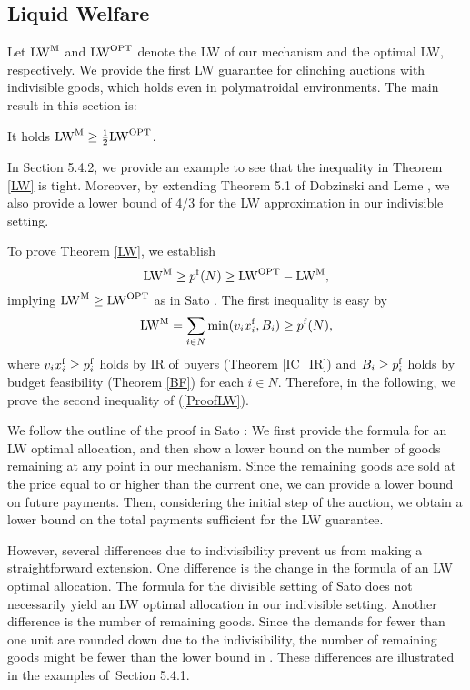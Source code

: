 \documentclass[letterpaper,11pt]{article}
\begin{document}
\subsection{Liquid Welfare}
	Let ${\rm LW}^{\rm M}$ and ${\rm LW}^{\rm OPT}$ denote the LW of 
	our mechanism and the optimal LW, respectively.
	We provide the first LW guarantee for clinching auctions with indivisible goods, 
	which holds even in polymatroidal environments.
	The main result in this section is: 
	
	\begin{theorem}
	\label{LW}
	It holds ${\rm LW}^{\rm M}\geq \frac{1}{2}{\rm LW}^{\rm OPT}$.
	\end{theorem}
	\begin{remark}
	In Section 5.4.2, we provide an example to see that the inequality in Theorem \ref{LW} is tight. 	
	Moreover, by extending Theorem 5.1 of Dobzinski and Leme \cite{DL2014}, 
	we also provide a lower bound of 4/3 for the LW approximation in our indivisible setting.
	\end{remark}
	To prove Theorem \ref{LW}, we establish 
	\begin{equation}	
	\label{ProofLW}
	{\rm LW}^{\rm M}\geq p^{\rm f}(N)\geq {\rm LW}^{\rm OPT}-{\rm LW}^{\rm M}, 
	\end{equation}
	implying ${\rm LW}^{\rm M}\geq {\rm LW}^{\rm OPT}$ as in Sato \cite{S2023}. 
	The first inequality is easy by  
	\begin{equation}
	\label{lowerbound}
	{\rm LW}^{\rm M}=\sum_{i\in N}\min(v_i x^{\rm f}_i, B_i)\geq p^{\rm f}(N), 
	\end{equation}
	where 
	$v_i x^{\rm f}_i \geq p^{\rm f}_i$ holds by IR of buyers (Theorem \ref{IC_IR}) and 
	$B_i\geq p^{\rm f}_i$ holds by budget feasibility (Theorem \ref{BF}) for each $i\in N$.
	Therefore, in the following, we prove the second inequality of (\ref{ProofLW}).
	
	We follow the outline of the proof in Sato \cite{S2023}: 
We first provide the formula for an LW optimal allocation, and then show a lower bound on the number of goods remaining at any point in our mechanism. Since the remaining goods are sold at the price equal to or higher than the current one, we can provide a lower bound on future payments. Then, considering the initial step of the auction, we obtain a lower bound on the total payments sufficient for the LW guarantee.
	
	However, several differences due to indivisibility prevent us from making a straightforward extension. 
	One difference is the change in the formula of an LW optimal allocation. 
	The formula for the divisible setting of Sato \cite{S2023} 
	does not necessarily yield an LW optimal allocation in our indivisible setting.
	Another difference is the number of remaining goods. 
	Since the demands for fewer than one unit are rounded down due to the indivisibility, 
	the number of remaining goods might be fewer than the lower bound in \cite{S2023}. 
	These differences are illustrated in the examples of~Section 5.4.1. 
\end{document}

